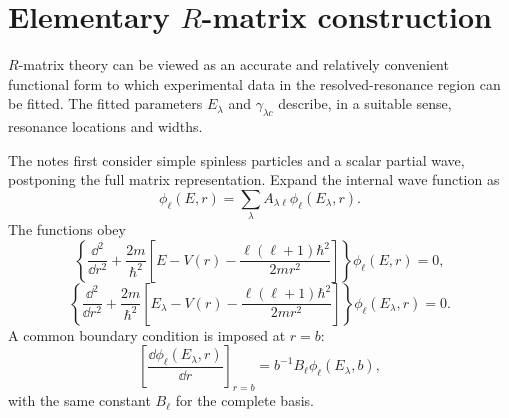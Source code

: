 \section{Elementary \texorpdfstring{$R$}{R}-matrix construction}
$R$-matrix theory can be viewed as an accurate and relatively convenient functional form to which experimental data in the resolved-resonance region can be fitted.  The fitted parameters $E_\lambda$ and $\gamma_{\lambda c}$ describe, in a suitable sense, resonance locations and widths.

The notes first consider simple spinless particles and a scalar partial wave, postponing the full matrix representation.  Expand the internal wave function as
\begin{equation*}
  \phi_\ell(E,r)=\sum_\lambda A_{\lambda\ell}\phi_\ell(E_\lambda,r).
  \tag{20}\label{eq:rt2-internal-expansion}
\end{equation*}
The functions obey
\begin{equation*}
  \left\{\frac{\dd^2}{\dd r^2}
  +\frac{2m}{\hbar^2}\left[E-V(r)
  -\frac{\ell(\ell+1)\hbar^2}{2mr^2}\right]\right\}
  \phi_\ell(E,r)=0,
  \tag{21}\label{eq:rt2-physical-equation}
\end{equation*}
\begin{equation*}
  \left\{\frac{\dd^2}{\dd r^2}
  +\frac{2m}{\hbar^2}\left[E_\lambda-V(r)
  -\frac{\ell(\ell+1)\hbar^2}{2mr^2}\right]\right\}
  \phi_\ell(E_\lambda,r)=0.
  \tag{22}\label{eq:rt2-basis-equation}
\end{equation*}
A common boundary condition is imposed at $r=b$:
\begin{equation*}
  \left[\frac{\dd\phi_\ell(E_\lambda,r)}{\dd r}\right]_{r=b}
  =b^{-1}B_\ell\phi_\ell(E_\lambda,b),
  \tag{23}\label{eq:rt2-basis-boundary}
\end{equation*}
with the same constant $B_\ell$ for the complete basis.

